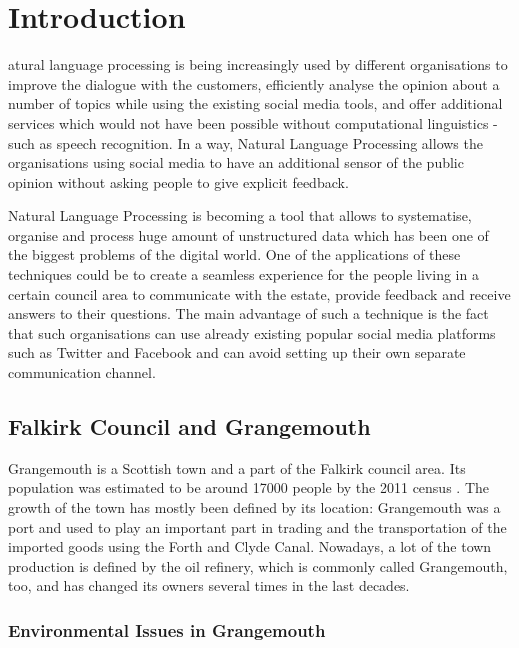 \let\textcircled=\pgftextcircled
\chapter{Introduction}
\label{chap:intro}

atural language processing is being increasingly used by different organisations to  improve the dialogue with the customers, efficiently analyse the opinion about a number of topics while using the existing social media tools, and offer additional services which would not have been possible without computational linguistics - such as speech recognition. In a way, Natural Language Processing allows the organisations using social media to have an additional sensor of the public opinion without asking people to give explicit feedback.

Natural Language Processing is becoming a tool that allows to systematise, organise and process huge amount of unstructured data which has been one of the biggest problems of the digital world. One of the applications of these techniques could be to create a seamless experience for the people living in a certain council area to communicate with the estate, provide feedback and receive answers to their questions. The main advantage of such a technique is the fact that such organisations can use already existing popular social media platforms such as Twitter and Facebook and can avoid setting up their own separate communication channel. 


\section{Falkirk Council and Grangemouth}
\label{sec:falkirk}

Grangemouth is a Scottish town and a part of the Falkirk council area. Its population was estimated to be around 17000 people by the 2011 census \cite{falkirkcensus}. The growth of the town has mostly been defined by its location: Grangemouth was a port and used to play an important part in trading and the transportation of the imported goods using the Forth and Clyde Canal. Nowadays, a lot of the town production is defined by the oil refinery, which is commonly called Grangemouth, too, and has changed its owners several times in the last decades. 

\subsection{Environmental Issues in Grangemouth}
\label{subsec:environment}

